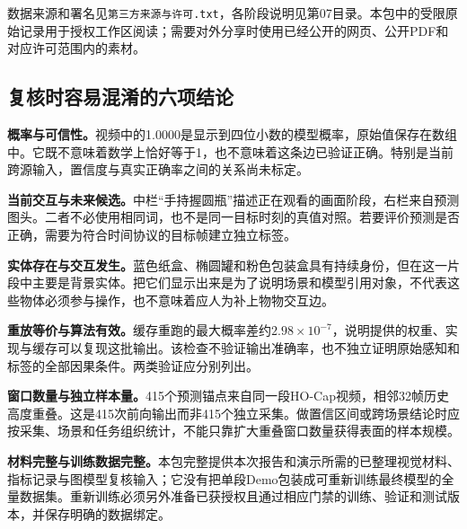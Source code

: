 \documentclass[11pt,a4paper,UTF8,fontset=fandol]{ctexart}
\newcommand{\code}[1]{{\small\nolinkurl{#1}}}
\begin{document}
数据来源和署名见\code{第三方来源与许可.txt}，各阶段说明见第07目录。本包中的受限原始记录用于授权工作区阅读；需要对外分享时使用已经公开的网页、公开PDF和对应许可范围内的素材。

\subsection{复核时容易混淆的六项结论}
\textbf{概率与可信性。}视频中的1.0000是显示到四位小数的模型概率，原始值保存在数组中。它既不意味着数学上恰好等于1，也不意味着这条边已验证正确。特别是当前跨源输入，置信度与真实正确率之间的关系尚未标定。

\textbf{当前交互与未来候选。}中栏“手持握圆瓶”描述正在观看的画面阶段，右栏来自预测图头。二者不必使用相同词，也不是同一目标时刻的真值对照。若要评价预测是否正确，需要为符合时间协议的目标帧建立独立标签。

\textbf{实体存在与交互发生。}蓝色纸盒、椭圆罐和粉色包装盒具有持续身份，但在这一片段中主要是背景实体。把它们显示出来是为了说明场景和模型引用对象，不代表这些物体必须参与操作，也不意味着应人为补上物物交互边。

\textbf{重放等价与算法有效。}缓存重跑的最大概率差约$2.98\times10^{-7}$，说明提供的权重、实现与缓存可以复现这批输出。该检查不验证输出准确率，也不独立证明原始感知和标签的全部因果条件。两类验证应分别列出。

\textbf{窗口数量与独立样本量。}415个预测锚点来自同一段HO-Cap视频，相邻32帧历史高度重叠。这是415次前向输出而非415个独立采集。做置信区间或跨场景结论时应按采集、场景和任务组织统计，不能只靠扩大重叠窗口数量获得表面的样本规模。

\textbf{材料完整与训练数据完整。}本包完整提供本次报告和演示所需的已整理视觉材料、指标记录与图模型复核输入；它没有把单段Demo包装成可重新训练最终模型的全量数据集。重新训练必须另外准备已获授权且通过相应门禁的训练、验证和测试版本，并保存明确的数据绑定。
\end{document}
